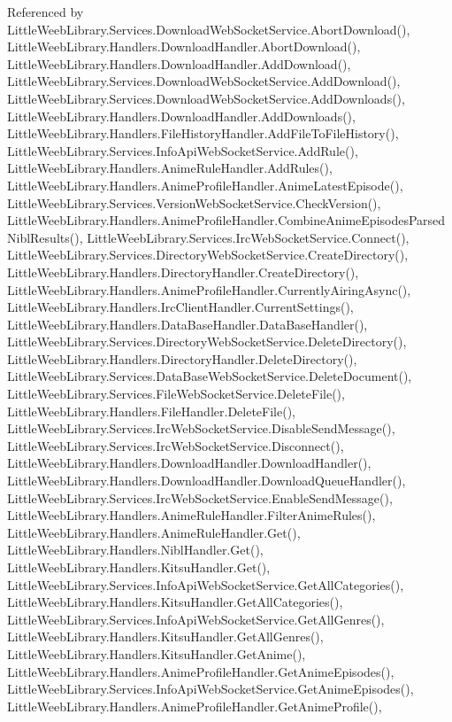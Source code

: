 Referenced by Little\+Weeb\+Library.\+Services.\+Download\+Web\+Socket\+Service.\+Abort\+Download(), Little\+Weeb\+Library.\+Handlers.\+Download\+Handler.\+Abort\+Download(), Little\+Weeb\+Library.\+Handlers.\+Download\+Handler.\+Add\+Download(), Little\+Weeb\+Library.\+Services.\+Download\+Web\+Socket\+Service.\+Add\+Download(), Little\+Weeb\+Library.\+Services.\+Download\+Web\+Socket\+Service.\+Add\+Downloads(), Little\+Weeb\+Library.\+Handlers.\+Download\+Handler.\+Add\+Downloads(), Little\+Weeb\+Library.\+Handlers.\+File\+History\+Handler.\+Add\+File\+To\+File\+History(), Little\+Weeb\+Library.\+Services.\+Info\+Api\+Web\+Socket\+Service.\+Add\+Rule(), Little\+Weeb\+Library.\+Handlers.\+Anime\+Rule\+Handler.\+Add\+Rules(), Little\+Weeb\+Library.\+Handlers.\+Anime\+Profile\+Handler.\+Anime\+Latest\+Episode(), Little\+Weeb\+Library.\+Services.\+Version\+Web\+Socket\+Service.\+Check\+Version(), Little\+Weeb\+Library.\+Handlers.\+Anime\+Profile\+Handler.\+Combine\+Anime\+Episodes\+Parsed\+Nibl\+Results(), Little\+Weeb\+Library.\+Services.\+Irc\+Web\+Socket\+Service.\+Connect(), Little\+Weeb\+Library.\+Services.\+Directory\+Web\+Socket\+Service.\+Create\+Directory(), Little\+Weeb\+Library.\+Handlers.\+Directory\+Handler.\+Create\+Directory(), Little\+Weeb\+Library.\+Handlers.\+Anime\+Profile\+Handler.\+Currently\+Airing\+Async(), Little\+Weeb\+Library.\+Handlers.\+Irc\+Client\+Handler.\+Current\+Settings(), Little\+Weeb\+Library.\+Handlers.\+Data\+Base\+Handler.\+Data\+Base\+Handler(), Little\+Weeb\+Library.\+Services.\+Directory\+Web\+Socket\+Service.\+Delete\+Directory(), Little\+Weeb\+Library.\+Handlers.\+Directory\+Handler.\+Delete\+Directory(), Little\+Weeb\+Library.\+Services.\+Data\+Base\+Web\+Socket\+Service.\+Delete\+Document(), Little\+Weeb\+Library.\+Services.\+File\+Web\+Socket\+Service.\+Delete\+File(), Little\+Weeb\+Library.\+Handlers.\+File\+Handler.\+Delete\+File(), Little\+Weeb\+Library.\+Services.\+Irc\+Web\+Socket\+Service.\+Disable\+Send\+Message(), Little\+Weeb\+Library.\+Services.\+Irc\+Web\+Socket\+Service.\+Disconnect(), Little\+Weeb\+Library.\+Handlers.\+Download\+Handler.\+Download\+Handler(), Little\+Weeb\+Library.\+Handlers.\+Download\+Handler.\+Download\+Queue\+Handler(), Little\+Weeb\+Library.\+Services.\+Irc\+Web\+Socket\+Service.\+Enable\+Send\+Message(), Little\+Weeb\+Library.\+Handlers.\+Anime\+Rule\+Handler.\+Filter\+Anime\+Rules(), Little\+Weeb\+Library.\+Handlers.\+Anime\+Rule\+Handler.\+Get(), Little\+Weeb\+Library.\+Handlers.\+Nibl\+Handler.\+Get(), Little\+Weeb\+Library.\+Handlers.\+Kitsu\+Handler.\+Get(), Little\+Weeb\+Library.\+Services.\+Info\+Api\+Web\+Socket\+Service.\+Get\+All\+Categories(), Little\+Weeb\+Library.\+Handlers.\+Kitsu\+Handler.\+Get\+All\+Categories(), Little\+Weeb\+Library.\+Services.\+Info\+Api\+Web\+Socket\+Service.\+Get\+All\+Genres(), Little\+Weeb\+Library.\+Handlers.\+Kitsu\+Handler.\+Get\+All\+Genres(), Little\+Weeb\+Library.\+Handlers.\+Kitsu\+Handler.\+Get\+Anime(), Little\+Weeb\+Library.\+Handlers.\+Anime\+Profile\+Handler.\+Get\+Anime\+Episodes(), Little\+Weeb\+Library.\+Services.\+Info\+Api\+Web\+Socket\+Service.\+Get\+Anime\+Episodes(), Little\+Weeb\+Library.\+Handlers.\+Anime\+Profile\+Handler.\+Get\+Anime\+Profile(), 